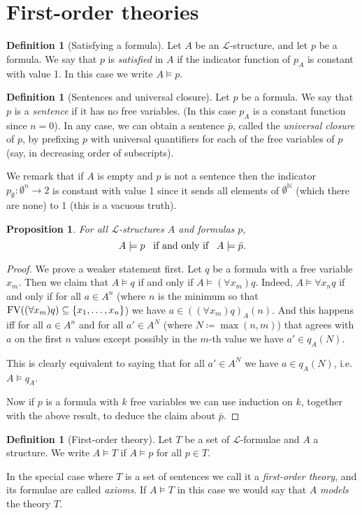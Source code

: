 \documentclass{report}
\theoremstyle{definition}
\theoremstyle{plain}
\newtheorem{prop}[thm]{Proposition}
\theoremstyle{definition}
\newtheorem{defn}[thm]{Definition}
\begin{document}
	\section{First-order theories}
	\begin{defn}[Satisfying a formula]
		Let $A$ be an $\mathcal{L}$-structure, and let $p$ be a formula. We say that $p$ is \emph{satisfied} in $A$ if the indicator function of $p_A$ is constant with value 1. In this case we write $A\models p$. 
	\end{defn}
	\begin{defn}[Sentences and universal closure]
		Let $p$ be a formula. We say that $p$ is a \emph{sentence} if it has no free variables. (In this case $p_A$ is a constant function since $n=0$). In any case, we can obtain a sentence $\bar{p}$, called the \emph{universal closure} of $p$, by prefixing $p$ with universal quantifiers for each of the free variables of $p$ (say, in decreasing order of subscripts).
	\end{defn}
	We remark that if $A$ is empty and $p$ is not a sentence then the indicator $p_\emptyset \colon \emptyset^{n} \to 2$ is constant with value 1 since it sends all elements of $\emptyset^{\mathbb{N}}$ (which there are none) to 1 (this is a vacuous truth).
	\begin{prop}
		For all $\mathcal{L}$-structures $A$ and formulas $p$,
		\[
		A \models p \,\,\,\textnormal{ if and only if }\,\,\, A\models \bar{p}.
		\]
	\end{prop}
	\begin{proof}
		We prove a weaker statement first. Let $q$ be a formula with a free variable $x_m$. Then we claim that $A \models q$ if and only if $A\models (\forall x_m) q$. Indeed, $A\models \forall x_n q$ if and only if for all $a\in A^{n}$ (where $n$ is the minimum so that $\textnormal{FV}((\forall x_m) q)\subseteq \{x_1,\ldots,x_n\}$) we have $a\in ((\forall x_m) q)_A(n)$. And this happens iff for all $a\in A^n$ and for all $a'\in A^{N}$ (where $N\coloneqq \max(n,m)$) that agrees with $a$ on the first $n$ values except possibly in the $m$-th value we have $a'\in q_A(N)$.
		
		This is clearly equivalent to saying that for all $a' \in A^N$ we have $a \in q_A(N)$, i.e. $A \models q_A$.
		
		Now if $p$ is a formula with $k$ free variables we can use induction on $k$, together with the above result, to deduce the claim about $\bar{p}$. 
	\end{proof}
	\begin{defn}[First-order theory]
		Let $T$ be a set of $\mathcal{L}$-formulae and $A$ a structure. We write $A\models T$ if $A\models p$ for all $p\in T$.
		
		In the special case where $T$ is a set of sentences we call it a \emph{first-order theory}, and its formulae are called \emph{axioms}. If $A\models T$ in this case we would say that $A$ \emph{models} the theory $T$.
	\end{defn}
\end{document}

